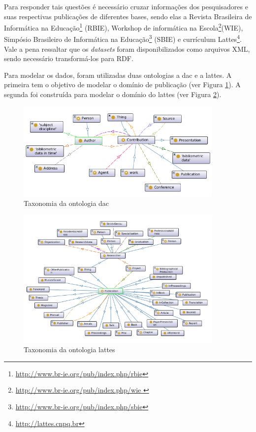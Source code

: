 Para responder tais questões é necessário cruzar informações dos pesquisadores e suas respectivas publicações de diferentes bases, sendo elas a Revista Brasileira de Informática na Educação\footnote{\url{http://www.br-ie.org/pub/index.php/rbie}} (RBIE), Workshop de informática na Escola\footnote{\url{http://www.br-ie.org/pub/index.php/wie }}(WIE), Simpósio Brasileiro de Informática na Educação\footnote{\url{http://www.br-ie.org/pub/index.php/sbie}} (SBIE) e currículum Lattes\footnote{\url{http://lattes.cnpq.br}}. Vale a pena ressaltar que os \textit{datasets} foram disponibilizados como arquivos XML, sendo necessário transformá-los para RDF.

Para modelar os dados, foram utilizadas duas ontologias a dac e a lattes. A primeira tem o objetivo de modelar o domínio de publicação (ver Figura \ref{fig:dac}). A segunda foi construída para modelar o domínio do lattes (ver Figura \ref{fig:lattes}).

\begin{figure}[!ht]
	\centering
	\includegraphics[width=0.9\textwidth]{./imagens/dac-mainview.png}
    \caption{Taxonomia da ontologia dac}
	\label{fig:dac}
\end{figure}

\begin{figure}[!ht]
	\centering
	\includegraphics[width=0.9\textwidth]{./imagens/lattes-mainview.png}
    \caption{Taxonomia da ontologia lattes}
	\label{fig:lattes}
\end{figure}

